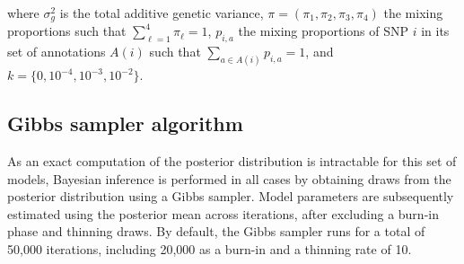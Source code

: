 \documentclass{ol-softwaremanual}
\begin{document}
\begin{table}[h]
\end{table}

\noindent where $\sigma_g^2$ is the total additive genetic variance, $\pi=(\pi_1,\pi_2,\pi_3,\pi_4)$ the mixing proportions such that $\sum_{\ell=1}^4\pi_\ell=1$, $p_{i,a}$ the mixing proportions of SNP $i$ in its set of annotations $A(i)$ such that $\sum_{a \in A(i)}p_{i,a}=1$, and $k=\{0,10^{-4}, 10^{-3}, 10^{-2}\}$.

\subsection{Gibbs sampler algorithm}

As an exact computation of the posterior distribution is intractable for this set of models, Bayesian inference is performed in all cases by obtaining draws from the posterior distribution using a Gibbs sampler. Model parameters are subsequently estimated using the posterior mean across iterations, after excluding a burn-in phase and thinning draws. By default, the Gibbs sampler runs for a total of 50,000 iterations, including 20,000 as a burn-in and a thinning rate of 10.
\end{document}
